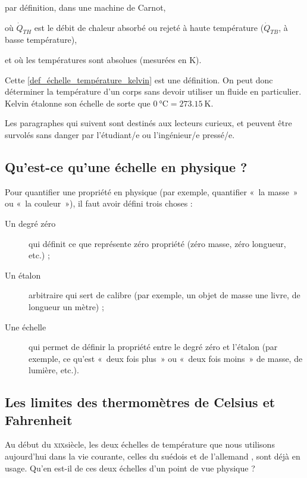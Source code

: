 		\begin{equationterms}
			\item par définition, dans une machine de Carnot,
			\item où \tab $\dot{Q}_{TH}$ \tab est le débit de chaleur absorbé ou rejeté à haute température ($\dot{Q}_{TB}$, à basse température),
			\item et où les températures sont absolues (mesurées en \si{\kelvin}).
		\end{equationterms}

		Cette \cref{def_échelle_température_kelvin} est une définition. On peut donc déterminer la température d’un corps sans devoir utiliser un fluide en particulier. Kelvin étalonne son échelle de sorte que $\SI{0}{\degreeCelsius} = \SI{273,15}{\kelvin}$. 
		
		Les paragraphes qui suivent sont destinés aux lecteurs curieux, et peuvent être survolés sans danger par l’étudiant/e ou l’ingénieur/e pressé/e. 

	\subsection{Qu’est-ce qu’une échelle en physique ?}
	
		Pour quantifier une propriété en physique (par exemple, quantifier «~la masse~» ou «~la couleur~»), il faut avoir défini trois choses :
		
		\begin{description}
			\item [Un degré zéro] qui définit ce que représente zéro propriété (zéro masse, zéro longueur, etc.) ;
			\item [Un étalon] arbitraire qui sert de calibre (par exemple, un objet de masse une livre, de longueur un mètre) ;
			\item [Une échelle] qui permet de définir la propriété entre le degré zéro et l’étalon (par exemple, ce qu’est «~deux fois plus~» ou «~deux fois moins~» de masse, de lumière, etc.).
		\end{description}
	
	\subsection{Les limites des thermomètres de Celsius et Fahrenheit}
	
		Au début du \textsc{xix}\ieme siècle, les deux échelles de température que nous utilisons aujourd’hui dans la vie courante, celles du suédois  et de l’allemand , sont déjà en usage. Qu’en est-il de ces deux échelles d’un point de vue physique ?
			

